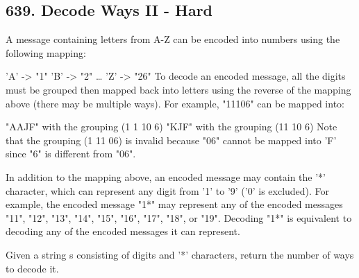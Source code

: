 \documentclass[9pt, b5paaper]{book}
\begin{document}
\subsection{639. Decode Ways II - Hard}
\label{sec-1-4-60}
A message containing letters from A-Z can be encoded into numbers using the following mapping:

'A' -> "1"
'B' -> "2"
\ldots{}
'Z' -> "26"
To decode an encoded message, all the digits must be grouped then mapped back into letters using the reverse of the mapping above (there may be multiple ways). For example, "11106" can be mapped into:

"AAJF" with the grouping (1 1 10 6)
"KJF" with the grouping (11 10 6)
Note that the grouping (1 11 06) is invalid because "06" cannot be mapped into 'F' since "6" is different from "06".

In addition to the mapping above, an encoded message may contain the '*' character, which can represent any digit from '1' to '9' ('0' is excluded). For example, the encoded message "1*" may represent any of the encoded messages "11", "12", "13", "14", "15", "16", "17", "18", or "19". Decoding "1*" is equivalent to decoding any of the encoded messages it can represent.

Given a string s consisting of digits and '*' characters, return the number of ways to decode it.
\end{document}
